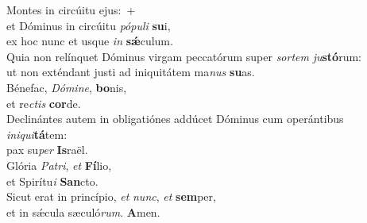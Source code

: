 \evenverse Montes in circúitu ejus:~+\\\evenverse  et Dóminus in circúitu \textit{pó}\textit{pu}\textit{li} \textbf{su}i,~\*\\
\evenverse ex hoc nunc et usque \textit{in} \textbf{sǽ}culum.\\
\oddverse Quia non relínquet Dóminus virgam peccatórum super \textit{sor}\textit{tem} \textit{ju}\textbf{stó}rum:~\*\\
\oddverse ut non exténdant justi ad iniquitátem ma\textit{nus} \textbf{su}as.\\
\evenverse Bénefac, \textit{Dó}\textit{mi}\textit{ne}, \textbf{bo}nis,~\*\\
\evenverse et re\textit{ctis} \textbf{cor}de.\\
\oddverse Declinántes autem in obligatiónes addúcet Dóminus cum operántibus \textit{i}\textit{ni}\textit{qui}\textbf{tá}tem:~\*\\
\oddverse pax su\textit{per} \textbf{Is}raël.\\
\evenverse Glória \textit{Pa}\textit{tri}, \textit{et} \textbf{Fí}lio,~\*\\
\evenverse et Spirítu\textit{i} \textbf{San}cto.\\
\oddverse Sicut erat in princípio, \textit{et} \textit{nunc}, \textit{et} \textbf{sem}per,~\*\\
\oddverse et in sǽcula sæculó\textit{rum}. \textbf{A}men.\\
